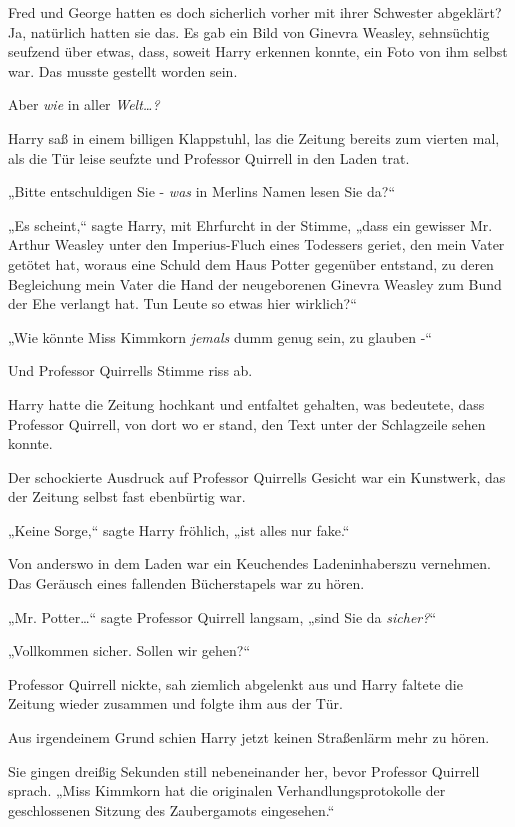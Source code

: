 {Fred und George hatten es doch sicherlich vorher mit ihrer Schwester abgeklärt? Ja, natürlich hatten sie das. Es gab ein Bild von Ginevra Weasley, sehnsüchtig seufzend über etwas, dass, soweit Harry erkennen konnte, ein Foto von ihm selbst war. Das musste gestellt worden sein.

Aber \emph{wie} in aller \emph{Welt…?}

Harry saß in einem billigen Klappstuhl, las die Zeitung bereits zum vierten mal, als die Tür leise seufzte und Professor Quirrell in den Laden trat.

„Bitte entschuldigen Sie - \emph{was} in Merlins Namen lesen Sie da?“

„Es scheint,“ sagte Harry, mit Ehrfurcht in der Stimme, „dass ein gewisser Mr. Arthur Weasley unter den Imperius-Fluch eines Todessers geriet, den mein Vater getötet hat, woraus eine Schuld dem Haus Potter gegenüber entstand, zu deren Begleichung mein Vater die Hand der neugeborenen Ginevra Weasley zum Bund der Ehe verlangt hat. Tun Leute so etwas hier wirklich?“

„Wie könnte Miss Kimmkorn \emph{jemals} dumm genug sein, zu glauben -“

Und Professor Quirrells Stimme riss ab.

Harry hatte die Zeitung hochkant und entfaltet gehalten, was bedeutete, dass Professor Quirrell, von dort wo er stand, den Text unter der Schlagzeile sehen konnte.

Der schockierte Ausdruck auf Professor Quirrells Gesicht war ein Kunstwerk, das der Zeitung selbst fast ebenbürtig war.

„Keine Sorge,“ sagte Harry fröhlich, „ist alles nur fake.“

Von anderswo in dem Laden war ein Keuchendes Ladeninhaberszu vernehmen. Das Geräusch eines fallenden Bücherstapels war zu hören.

„Mr. Potter…“ sagte Professor Quirrell langsam, „sind Sie da \emph{sicher?}“

„Vollkommen sicher. Sollen wir gehen?“

Professor Quirrell nickte, sah ziemlich abgelenkt aus und Harry faltete die Zeitung wieder zusammen und folgte ihm aus der Tür.

Aus irgendeinem Grund schien Harry jetzt keinen Straßenlärm mehr zu hören.

Sie gingen dreißig Sekunden still nebeneinander her, bevor Professor Quirrell sprach. „Miss Kimmkorn hat die originalen Verhandlungsprotokolle der geschlossenen Sitzung des Zaubergamots eingesehen.“

}
